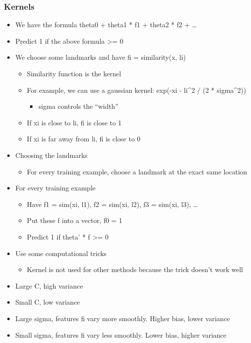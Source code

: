 \documentclass[]{article}
\providecommand{\tightlist}{%
  \setlength{\itemsep}{0pt}\setlength{\parskip}{0pt}}
\begin{document}
\hypertarget{kernels}{%
\subsubsection{Kernels}\label{kernels}}

\begin{itemize}
\tightlist
\item
  We have the formula theta0 + theta1 * f1 + theta2 * f2 + \ldots{}
\item
  Predict 1 if the above formula \textgreater{}= 0
\item
  We choose some landmarks and have fi = similarity(x, li)

  \begin{itemize}
  \tightlist
  \item
    Similarity function is the kernel
  \item
    For example, we can use a gaussian kernel:
    exp(-\textbar{}\textbar{}xi - li\textbar{}\textbar{}\^{}2 / (2 *
    sigma\^{}2))

    \begin{itemize}
    \tightlist
    \item
      sigma controls the ``width''
    \end{itemize}
  \item
    If xi is close to li, fi is close to 1
  \item
    If xi is far away from li, fi is close to 0
  \end{itemize}
\item
  Choosing the landmarks

  \begin{itemize}
  \tightlist
  \item
    For every training example, choose a landmark at the exact same
    location
  \end{itemize}
\item
  For every training example

  \begin{itemize}
  \tightlist
  \item
    Have f1 = sim(xi, l1), f2 = sim(xi, l2), f3 = sim(xi, l3), \ldots{}
  \item
    Put these f into a vector, f0 = 1
  \item
    Predict 1 if theta' * f \textgreater{}= 0
  \end{itemize}
\item
  Use some computational tricks

  \begin{itemize}
  \tightlist
  \item
    Kernel is not used for other methods because the trick doesn't work
    well
  \end{itemize}
\item
  Large C, high variance
\item
  Small C, low variance
\item
  Large sigma, features fi vary more smoothly. Higher bias, lower
  variance
\item
  Small sigma, features fi vary less smoothly. Lower bias, higher
  variance
\end{itemize}
\end{document}
